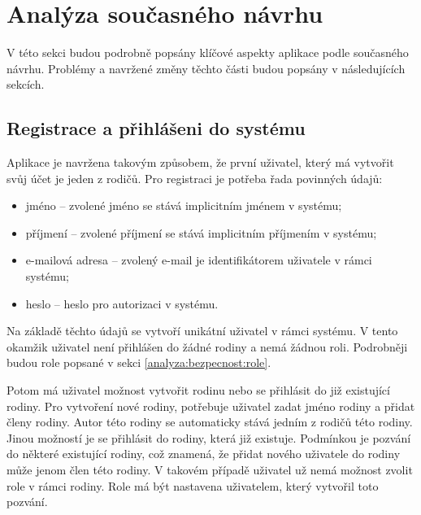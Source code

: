 \section{Analýza současného návrhu} \label{analyza:analyza navrhu}
    V této sekci budou podrobně popsány klíčové aspekty aplikace podle současného návrhu. Problémy a navržené změny těchto části budou popsány v následujících sekcích.

    \subsection{Registrace a přihlášeni do systému}
        Aplikace je navržena takovým způsobem, že první uživatel, který má vytvořit svůj účet je jeden z rodičů. Pro registraci je potřeba řada povinných údajů:
        \begin{itemize}
	        \item jméno -- zvolené jméno se stává implicitním jménem v systému;
	        \item příjmení -- zvolené příjmení se stává implicitním příjmením v systému;
	        \item e-mailová adresa -- zvolený e-mail je identifikátorem uživatele v rámci systému;
	        \item heslo -- heslo pro autorizaci v systému.
        \end{itemize}
        Na základě těchto údajů se vytvoří unikátní uživatel v rámci systému. V tento okamžik uživatel není přihlášen do žádné rodiny a nemá žádnou roli. Podrobněji budou role popsané v sekci \ref{analyza:bezpecnost:role}.
        
        Potom má uživatel možnost vytvořit rodinu nebo se přihlásit do již existující rodiny. Pro vytvoření nové rodiny, potřebuje uživatel zadat jméno rodiny a přidat členy rodiny. Autor této rodiny se automaticky stává jedním z rodičů této rodiny. Jinou možností je se přihlásit do rodiny, která již existuje. Podmínkou je pozvání do některé existující rodiny, což znamená, že přidat nového uživatele do rodiny může jenom člen této rodiny. V takovém případě uživatel už nemá možnost zvolit role v rámci rodiny. Role má být nastavena uživatelem, který vytvořil toto pozvání.

